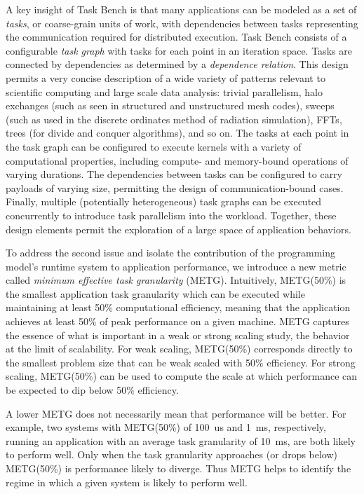 A key insight of Task Bench is that many applications can be modeled
as a set of \emph{tasks}, or coarse-grain units of work, with
dependencies between tasks representing the communication required for
distributed execution. Task Bench consists of a configurable \emph{task graph} with tasks for
each point in an iteration space. Tasks are connected by dependencies
as determined by a \emph{dependence relation}. This design permits a
very concise description of a wide variety of patterns relevant to
scientific computing and large scale data analysis: trivial parallelism, halo exchanges (such as
seen in structured and unstructured mesh codes), sweeps (such as used
in the discrete ordinates method of radiation simulation), FFTs, trees
(for divide and conquer algorithms), and so on. The tasks at each
point in the task graph can be configured to execute kernels with a
variety of computational properties, including compute- and
memory-bound operations of varying durations. The dependencies between
tasks can be configured to carry payloads of varying size, permitting
the design of communication-bound cases. Finally, multiple
(potentially heterogeneous) task graphs can be executed concurrently
to introduce task parallelism into the workload. Together, these
design elements permit the exploration of a large space of application
behaviors.

To address the second issue and isolate the contribution of the programming model's runtime system
to application performance, we introduce a new metric called
\emph{minimum effective task granularity} (METG). Intuitively,
METG(50\%) is the smallest application task granularity which can be
executed while maintaining at least 50\% computational efficiency,
meaning that the application achieves at least 50\% of peak
performance on a given machine. METG captures the essence of what is important in a weak
or strong scaling study, the behavior at the limit of scalability. For
weak scaling, METG(50\%) corresponds directly to the smallest problem
size that can be weak scaled with 50\% efficiency. For strong scaling,
METG(50\%) can be used to compute the scale at which performance can
be expected to dip below 50\% efficiency.

A lower METG does not necessarily mean that performance will be
better. For example, two systems with METG(50\%) of 100~us and 1~ms,
respectively, running an application with an average task granularity
of 10~ms, are both likely to perform well. Only when the task
granularity approaches (or drops below) METG(50\%) is performance
likely to diverge. Thus METG helps to identify the regime in which a
given system is likely to perform well.

